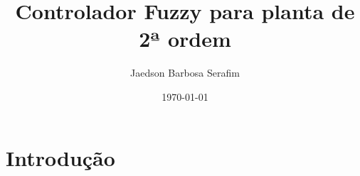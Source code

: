 \documentclass[12pt]{article}
\title{Controlador Fuzzy para planta de 2ª ordem}
\author{Jaedson Barbosa Serafim}
\date{\today}
\begin{document}
\maketitle

\tableofcontents

\section{Introdução}
\end{document}
